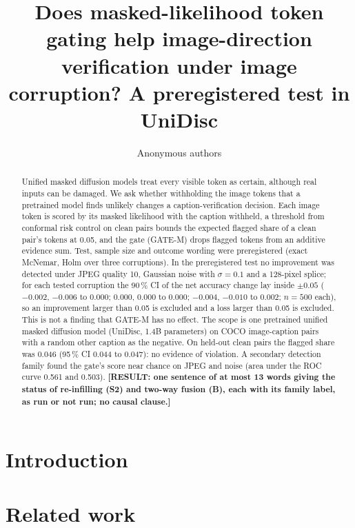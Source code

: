 \documentclass[10pt]{article}
\title{Does masked-likelihood token gating help image-direction verification under image corruption? A preregistered test in UniDisc}
\author{Anonymous authors}
\newcommand{\todo}[1]{{\color{red}\textbf{[#1]}}}
\theoremstyle{plain}
\theoremstyle{definition}
\begin{document}
\maketitle

\begin{abstract}
Unified masked diffusion models treat every visible token as certain, although real inputs can be damaged.
We ask whether withholding the image tokens that a pretrained model finds unlikely changes a caption-verification decision.
Each image token is scored by its masked likelihood with the caption withheld, a threshold from conformal risk control on clean pairs
bounds the expected flagged share of a clean pair's tokens at 0.05, and the gate (GATE-M) drops flagged tokens from an additive
evidence sum.
Test, sample size and outcome wording were preregistered (exact McNemar, Holm over three corruptions).
In the preregistered test no improvement was detected under JPEG quality 10, Gaussian noise with $\sigma=0.1$ and a 128-pixel splice;
for each tested corruption the 90\,\% CI of the net accuracy change lay inside $\pm0.05$ ($-0.002$, $-0.006$ to $0.000$; $0.000$,
$0.000$ to $0.000$; $-0.004$, $-0.010$ to $0.002$; $n=500$ each), so an improvement larger than 0.05 is excluded and a loss larger than
0.05 is excluded.
This is not a finding that GATE-M has no effect.
The scope is one pretrained unified masked diffusion model (UniDisc, 1.4B parameters) on COCO image-caption pairs with a random other
caption as the negative.
On held-out clean pairs the flagged share was 0.046 (95\,\% CI 0.044 to 0.047): no evidence of violation.
A secondary detection family found the gate's score near chance on JPEG and noise (area under the ROC curve 0.561 and 0.503).
\todo{RESULT: one sentence of at most 13 words giving the status of re-infilling (S2) and two-way fusion (B), each with its family
label, as run or not run; no causal clause.}
\end{abstract}

\section{Introduction}\label{sec:intro}

\FloatBarrier

\section{Related work}\label{sec:related}

\FloatBarrier
\end{document}
